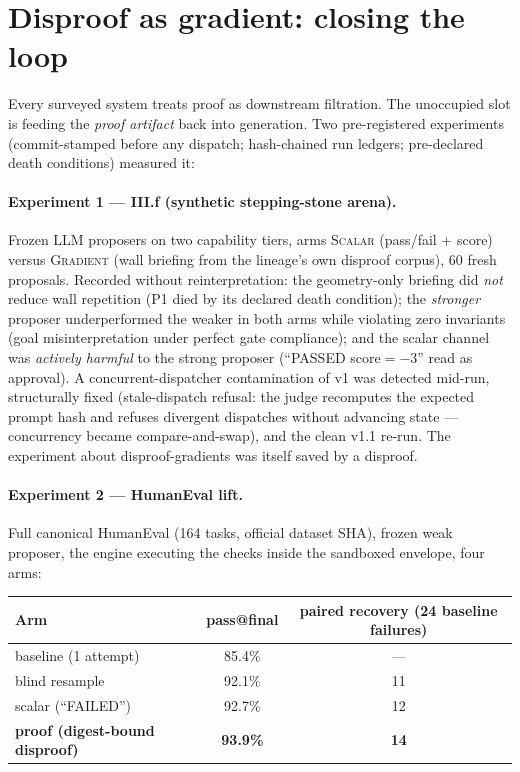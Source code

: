 \section{Disproof as gradient: closing the loop}\label{sec:gradient}

Every surveyed system treats proof as downstream filtration. The unoccupied slot
is feeding the \emph{proof artifact} back into generation. Two pre-registered
experiments (commit-stamped before any dispatch; hash-chained run ledgers;
pre-declared death conditions) measured it:

\paragraph{Experiment 1 --- III.f (synthetic stepping-stone arena).} Frozen LLM
proposers on two capability tiers, arms \textsc{Scalar} (pass/fail + score)
versus \textsc{Gradient} (wall briefing from the lineage's own disproof corpus),
60 fresh proposals. Recorded without reinterpretation: the geometry-only
briefing did \emph{not} reduce wall repetition (P1 died by its declared death
condition); the \emph{stronger} proposer underperformed the weaker in both arms
while violating zero invariants (goal misinterpretation under perfect gate
compliance); and the scalar channel was \emph{actively harmful} to the strong
proposer (``PASSED score$=-3$'' read as approval). A concurrent-dispatcher
contamination of v1 was detected mid-run, structurally fixed (stale-dispatch
refusal: the judge recomputes the expected prompt hash and refuses divergent
dispatches without advancing state --- concurrency became compare-and-swap), and
the clean v1.1 re-run. The experiment about disproof-gradients was itself saved
by a disproof.

\paragraph{Experiment 2 --- HumanEval lift.} Full canonical HumanEval (164
tasks, official dataset SHA), frozen weak proposer, the engine executing the
checks inside the sandboxed envelope, four arms:

\begin{center}
\begin{tabular}{lcc}
\toprule
Arm & pass@final & paired recovery (24 baseline failures)\\
\midrule
baseline (1 attempt) & 85.4\% & ---\\
blind resample & 92.1\% & 11\\
scalar (``FAILED'') & 92.7\% & 12\\
\textbf{proof (digest-bound disproof)} & \textbf{93.9\%} & \textbf{14}\\
\bottomrule
\end{tabular}
\end{center}


